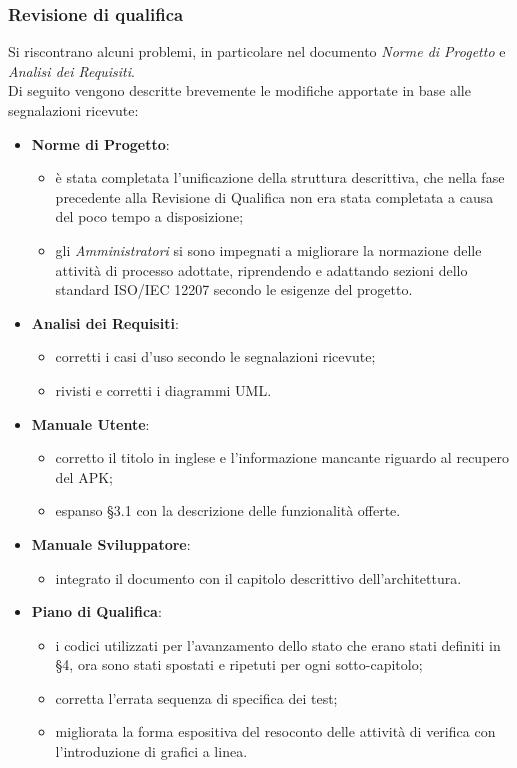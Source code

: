 	\subsubsection{Revisione di qualifica}
	Si riscontrano alcuni problemi, in particolare nel documento \textit{Norme di Progetto} e \textit{Analisi dei Requisiti}.\\
	Di seguito vengono descritte brevemente le modifiche apportate in base alle segnalazioni ricevute:
	\begin{itemize}
		\item \textbf{Norme di Progetto}: 
			\begin{itemize}
				\item è stata completata l'unificazione della struttura descrittiva, che nella fase precedente alla Revisione di Qualifica non era stata completata a causa del poco tempo a disposizione;
				\item gli \textit{Amministratori} si sono impegnati a migliorare la normazione delle attività di processo adottate, riprendendo e adattando sezioni dello standard ISO/IEC 12207 secondo le esigenze del progetto.  
			\end{itemize}
		\item \textbf{Analisi dei Requisiti}:
			\begin{itemize}
				\item corretti i casi d'uso secondo le segnalazioni ricevute;
				\item rivisti e corretti i diagrammi UML.
			\end{itemize}
		\item \textbf{Manuale Utente}:
			\begin{itemize}
				\item corretto il titolo in inglese e l'informazione mancante riguardo al recupero del 
				APK;
				\item espanso §3.1 con la descrizione delle funzionalità offerte.
			\end{itemize}
		\item \textbf{Manuale Sviluppatore}:
			\begin{itemize}
				\item integrato il documento con il capitolo descrittivo dell'architettura.
			\end{itemize}
		\item \textbf{Piano di Qualifica}:
			\begin{itemize}
				\item i codici utilizzati per l'avanzamento dello stato che erano stati definiti in §4, ora sono stati spostati e ripetuti per ogni sotto-capitolo;
				\item corretta l'errata sequenza di specifica dei test;
				\item migliorata la forma espositiva del resoconto delle attività di verifica con l'introduzione di grafici a linea.
			\end{itemize}
	\end{itemize}
	\newpage
